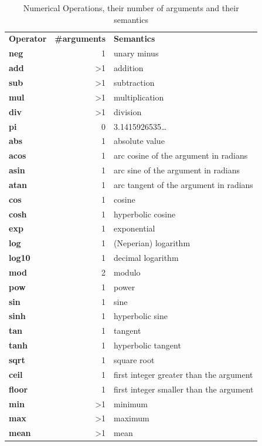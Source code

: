 \documentclass[11pt]{article}
\begin{document}
\begin{table}[htbp]
\caption{Numerical Operations, their number of arguments and their semantics \label{TableV-2}}
\centering
\begin{tabular}{lrl}
\textbf{Operator} & \textbf{\#arguments} & \textbf{Semantics}\\
\textbf{neg} & 1 & unary minus\\
\textbf{add} & >1 & addition\\
\textbf{sub} & >1 & subtraction\\
\textbf{mul} & >1 & multiplication\\
\textbf{div} & >1 & division\\
\textbf{pi} & 0 & 3.1415926535\ldots{}\\
\textbf{abs} & 1 & absolute value\\
\textbf{acos} & 1 & arc cosine of the argument in radians\\
\textbf{asin} & 1 & arc sine of the argument in radians\\
\textbf{atan} & 1 & arc tangent of the argument in radians\\
\textbf{cos} & 1 & cosine\\
\textbf{cosh} & 1 & hyperbolic cosine\\
\textbf{exp} & 1 & exponential\\
\textbf{log} & 1 & (Neperian) logarithm\\
\textbf{log10} & 1 & decimal logarithm\\
\textbf{mod} & 2 & modulo\\
\textbf{pow} & 1 & power\\
\textbf{sin} & 1 & sine\\
\textbf{sinh} & 1 & hyperbolic sine\\
\textbf{tan} & 1 & tangent\\
\textbf{tanh} & 1 & hyperbolic tangent\\
\textbf{sqrt} & 1 & square root\\
\textbf{ceil} & 1 & first integer greater than the argument\\
\textbf{floor} & 1 & first integer smaller than the argument\\
\textbf{min} & >1 & minimum\\
\textbf{max} & >1 & maximum\\
\textbf{mean} & >1 & mean\\
\end{tabular}
\end{table}
\end{document}
